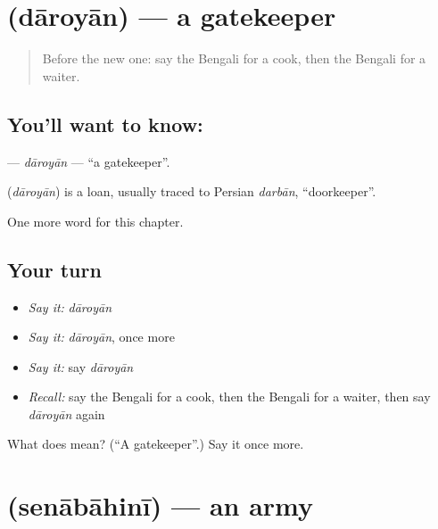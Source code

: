 \section[\texorpdfstring{\bn{দারোয়ান} (dāroyān)}{দারোয়ান (dāroyān)}]{ (dāroyān) — a gatekeeper}

\label{lesson:BN-C261-daroyan}



\begin{quote}
Before the new one: say the Bengali for a cook, then the Bengali for a waiter.
\end{quote}

\subsection*{You'll want to know: }
\textbf{} — \emph{dāroyān} — \textquotedblleft{}a gatekeeper\textquotedblright{}.

\begin{cousinweb}
\textbf{} (\emph{dāroyān}) is a loan, usually traced to Persian \emph{darbān}, \textquotedblleft{}doorkeeper\textquotedblright{}.
\end{cousinweb}

\begin{grammarlens}[title={What you've built}]
One more word for this chapter.
\end{grammarlens}

\subsection*{Your turn}
\begin{itemize}
\raggedright
  \item \emph{Say it:} \emph{dāroyān}
  \item \emph{Say it:} \emph{dāroyān}, once more
  \item \emph{Say it:} say \emph{dāroyān}
  \item \emph{Recall:} say the Bengali for a cook, then the Bengali for a waiter, then say \emph{dāroyān} again
\end{itemize}

\begin{tcolorbox}[breakable,colback=teal!4,colframe=teal!35!black,title={Before you move on}]
What does  mean? (\textquotedblleft{}A gatekeeper\textquotedblright{}.) Say it once more.
\end{tcolorbox}
\section[\texorpdfstring{\bn{সেনাবাহিনী} (senābāhinī)}{সেনাবাহিনী (senābāhinī)}]{ (senābāhinī) — an army}


